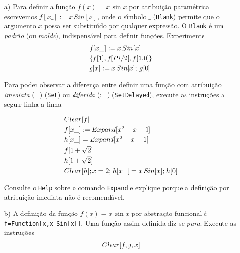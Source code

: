 \documentclass[11pt]{article}
\begin{document}
\begin{itemize}

\item[a)]  Para definir a fun\c{c}\~ao $f(x) = x \,\sin x$   por  atribui\c{c}\~ao param\'etrica escrevemos
$
f[x\_]:=x\, Sin[x]
$,
onde o s\'\i mbolo $\_$  (\texttt{Blank})  permite que o argumento $x$ possa ser substitu\'\i do por qualquer express\~ao.  O \texttt{Blank}  \'e um \textsl{padr\~ao} (ou \textsl{molde}),  indispens\'avel para definir fun\c{c}\~oes. Experimente
 \[\begin{array}{l}
f[x\_]:=x\, Sin[x]    \vspace{1mm}\\
\{f[1], f[Pi/2],f[1.0]\}  \vspace{1mm}\\
g[x]:=x\, Sin[x];\, g[0] 
\end{array}
 \]

Para poder observar a diferen\c{c}a entre definir uma fun\c{c}\~ao com atribui\c{c}\~ao \textsl{imediata} (=) (\texttt{Set}) ou \textsl{diferida} (:=) (\texttt{SetDelayed}),
 execute as instru\c{c}\~oes a seguir  linha a linha


 \[\begin{array}{l}
Clear[f]    \vspace{1mm}\\
f[x\_]:= Expand[x^2 + x + 1]  \vspace{1mm}\\
 h[x\_]=Expand[x^2 + x + 1]  \vspace{1mm}\\
f[1+\sqrt{2}] \vspace{1mm}\\
 h[1+\sqrt{2}]\vspace{1mm}\\
 Clear[h];x=2;\, h[x\_]=x\,Sin[x];\, h[0]
\end{array}
 \]

 Consulte o \texttt{Help} sobre o comando \texttt{Expand} e explique porque  a defini\c{c}\~ao por atribui\c{c}\~ao imediata n\~ao \'e recomend\'avel.


\item[b)]  A defini\c{c}\~ao da fun\c{c}\~ao $f(x) = x \, \sin x$  por abstra\c{c}\~ao funcional  \'e \texttt{f=Function[x,x Sin[x]]}. Uma fun\c{c}\~ao assim definida diz-se \textsl{pura}. Execute as instru\c{c}\~oes
 \[\begin{array}{l}
Clear[f,g,x]

  \vspace{1mm}
  

\end{array}\]
\end{itemize}
\end{document}
